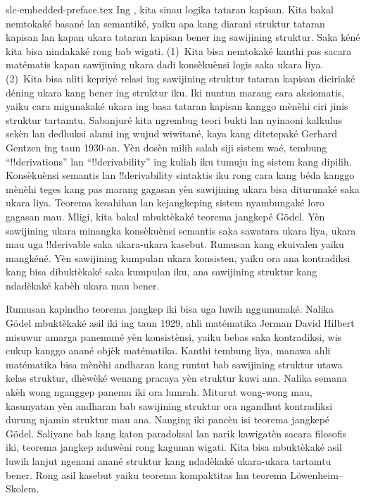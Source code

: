 \begin{filecontents*}[overwrite]{slc-embedded-preface.tex}
Ing , kita sinau logika tataran kapisan. Kita
bakal nemtokaké basané lan semantiké, yaiku apa kang diarani struktur
tataran kapisan lan kapan ukara tataran kapisan bener ing sawijining
struktur. Saka kéné kita bisa nindakaké rong bab wigati.
(1)~Kita bisa nemtokaké kanthi pas sacara matématis kapan sawijining
ukara dadi konsèkuènsi logis saka ukara liya. (2)~Kita bisa nliti
kepriyé relasi ing sawijining struktur tataran kapisan diciriaké déning
ukara kang bener ing struktur iku. Iki nuntun marang cara aksiomatis,
yaiku cara migunakaké ukara ing basa tataran kapisan kanggo mènèhi ciri
jinis struktur tartamtu. Sabanjuré kita ngrembug teori bukti lan
nyinaoni kalkulus sekèn lan dedhuksi alami ing wujud wiwitané,
kaya kang ditetepaké Gerhard Gentzen ing taun 1930-an. Yèn dosèn
milih salah siji sistem waé, tembung “!!{derivation}s” lan
“!!{derivability}” ing kuliah iku tumuju ing sistem kang dipilih.
Konsèkuènsi semantis lan !!{derivability} sintaktis iku rong cara kang
béda kanggo mènèhi teges kang pas marang gagasan yèn sawijining ukara
bisa diturunaké saka ukara liya. Teorema kesahihan lan kejangkeping
sistem nyambungaké loro gagasan mau. Mligi, kita bakal mbuktèkaké
teorema jangkepé G\"odel. Yèn sawijining ukara minangka konsèkuènsi
semantis saka sawatara ukara liya, ukara mau uga !!{derivable} saka
ukara-ukara kasebut. Rumusan kang ekuivalen yaiku mangkéné. Yèn
sawijining kumpulan ukara konsisten, yaiku ora ana kontradiksi kang bisa
dibuktèkaké saka kumpulan iku, ana sawijining struktur kang ndadèkaké
kabèh ukara mau bener.

Rumusan kapindho teorema jangkep iki bisa uga luwih nggumunaké.
Nalika G\"odel mbuktèkaké asil iki ing taun 1929, ahli matématika
Jerman David Hilbert misuwur amarga panemuné yèn konsistènsi, yaiku
bebas saka kontradiksi, wis cukup kanggo anané objèk matématika.
Kanthi tembung liya, manawa ahli matématika bisa mènèhi andharan kang
runtut bab sawijining struktur utawa kelas struktur, dhèwèké wenang
pracaya yèn struktur kuwi ana. Nalika semana akèh wong nganggep
panemu iki ora lumrah. Miturut wong-wong mau, kasunyatan yèn
andharan bab sawijining struktur ora ngandhut kontradiksi durung
njamin struktur mau ana. Nanging iki pancèn isi teorema jangkepé
G\"odel. Saliyane bab kang katon paradoksal lan narik kawigatèn sacara
filosofis iki, teorema jangkep nduwèni rong kagunan wigati. Kita bisa
mbuktèkaké asil luwih lanjut ngenani anané struktur kang ndadèkaké
ukara-ukara tartamtu bener. Rong asil kasebut yaiku teorema
kompaktitas lan teorema L\"owenheim--Skolem.


\end{filecontents*}
